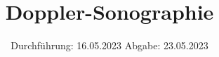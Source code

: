 

\subject{VERSUCH NUMMER US3}
\title{Doppler-Sonographie}
\date{
  Durchführung: 16.05.2023
  \hspace{3em}
  Abgabe: 23.05.2023
}



\maketitle
\thispagestyle{empty}
\tableofcontents
\newpage
\setcounter{page}{1}







\newpage
\printbibliography
\nocite{apus3}
\nocite{matplotlib}
\nocite{numpy}
\nocite{scipy}
\nocite{uncertainties}
\nocite{reback2020pandas}

\newpage
%
%
%


